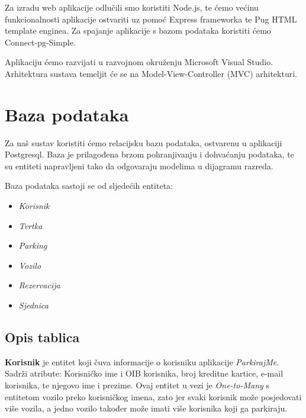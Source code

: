 		Za izradu web aplikacije odlučili smo koristiti Node.js, te ćemo većinu funkcionalnosti aplikacije ostvariti uz pomoć Express frameworka te Pug HTML template enginea. Za spajanje aplikacije s bazom podataka koristiti ćemo Connect-pg-Simple.
		
			Aplikaciju ćemo razvijati
		u razvojnom okruženju Microsoft Visual Studio. 
			Arhitektura sustava temeljit će se na 
		Model-View-Controller (MVC) arhitekturi. 
		
		
		\newpage
				
		\section{Baza podataka}
			
			Za naš sustav koristiti ćemo relacijsku bazu podataka, ostvarenu u aplikaciji Postgresql. Baza je prilagođena brzom pohranjivanju i dohvaćanju podataka, te su entiteti napravljeni tako da odgovaraju modelima u dijagramu razreda.
			
				Baza podataka sastoji se od sljedećih entiteta:
				\begin{itemize}
					\item 	\textit{Korisnik}
					\item 	\textit{Tvrtka}
					\item 	\textit{Parking}
					\item 	\textit{Vozilo}
					\item 	\textit{Rezervacija}
					\item 	\textit{Sjednica}
				\end{itemize}
		
			\subsection{Opis tablica}
			

				
				\textbf{Korisnik}  je entitet koji čuva informacije o korisniku aplikacije \textit{ParkirajMe}. Sadrži atribute: Korisničko ime i OIB korisnika, broj kreditne kartice, e-mail korisnika, te njegovo ime i prezime. Ovaj entitet u vezi je \textit{One-to-Many} s entitetom vozilo preko korisničkog imena, zato jer svaki korisnik može posjedovati više vozila, a jedno vozilo također može imati više korisnika koji ga parkiraju.
				


